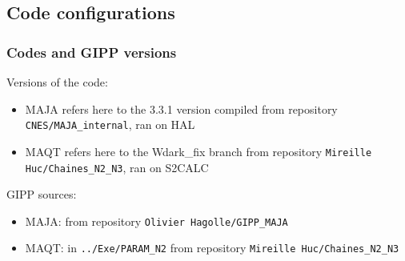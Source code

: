 \documentclass[8pt]{beamer}
\begin{document}
\subsection{Code configurations} 

\begin{frame}
\frametitle{Codes and GIPP versions}

	Versions of the code:
	
	\begin{itemize}
		\item MAJA refers here to the 3.3.1 version compiled from repository \texttt{CNES/MAJA\_internal}, ran on HAL
		\item MAQT refers here to the Wdark\_fix branch from repository \texttt{Mireille Huc/Chaines\_N2\_N3}, ran on S2CALC
	\end{itemize}
	
	GIPP sources:
	
	\begin{itemize}
		\item MAJA: from repository \texttt{Olivier Hagolle/GIPP\_MAJA}
		\item MAQT: in \texttt{../Exe/PARAM\_N2} from repository \texttt{Mireille Huc/Chaines\_N2\_N3}
	\end{itemize}
\end{frame}
\end{document}
